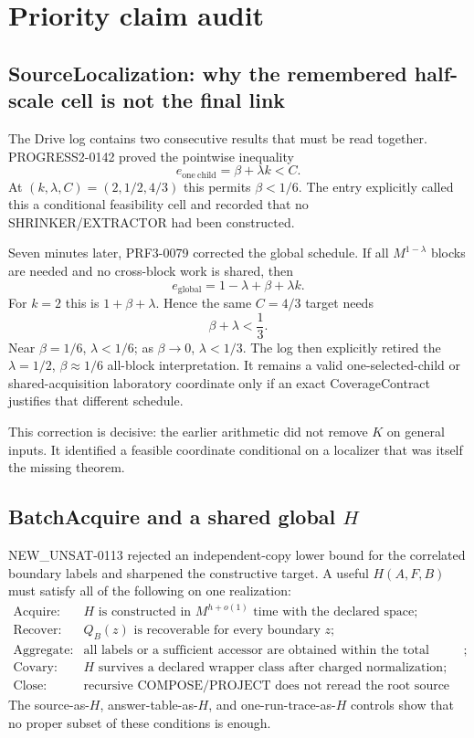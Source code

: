 \documentclass[10pt]{article}
\begin{document}
\normalsize

\section{Priority claim audit}

\subsection{SourceLocalization: why the remembered half-scale cell is not the final link}

The Drive log contains two consecutive results that must be read together.
PROGRESS2-0142 proved the pointwise inequality
\[
 e_{\mathrm{one\ child}}=\beta+\lambda k<C.
\]
At $(k,\lambda,C)=(2,1/2,4/3)$ this permits $\beta<1/6$.  The entry explicitly
called this a conditional feasibility cell and recorded that no
SHRINKER/EXTRACTOR had been constructed.

Seven minutes later, PRF3-0079 corrected the global schedule.  If all
$M^{1-\lambda}$ blocks are needed and no cross-block work is shared, then
\[
 e_{\mathrm{global}}=1-\lambda+\beta+\lambda k.
\]
For $k=2$ this is $1+\beta+\lambda$.  Hence the same $C=4/3$ target needs
\[
 \beta+\lambda<\frac13.
\]
Near $\beta=1/6$, $\lambda<1/6$; as $\beta\to0$, $\lambda<1/3$.  The log
then explicitly retired the $\lambda=1/2$, $\beta\approx1/6$ all-block
interpretation.  It remains a valid one-selected-child or shared-acquisition
laboratory coordinate only if an exact CoverageContract justifies that
different schedule.

This correction is decisive: the earlier arithmetic did not remove $K$ on
general inputs.  It identified a feasible coordinate conditional on a
localizer that was itself the missing theorem.

\subsection{BatchAcquire and a shared global \texorpdfstring{$H$}{H}}

NEW\_UNSAT-0113 rejected an independent-copy lower bound for the correlated
boundary labels and sharpened the constructive target.  A useful $H(A,F,B)$
must satisfy all of the following on one realization:
\[
\begin{array}{ll}
\text{Acquire:} & H\text{ is constructed in }M^{h+o(1)}\text{ time with the
declared space};\\
\text{Recover:} & Q_B(z)\text{ is recoverable for every boundary }z;\\
\text{Aggregate:} & \text{all labels or a sufficient accessor are obtained
within the total budget};\\
\text{Covary:} & H\text{ survives a declared wrapper class after charged
normalization};\\
\text{Close:} & \text{recursive COMPOSE/PROJECT does not reread the root
source at parent cost.}
\end{array}
\]
The source-as-$H$, answer-table-as-$H$, and one-run-trace-as-$H$ controls show
that no proper subset of these conditions is enough.
\end{document}
